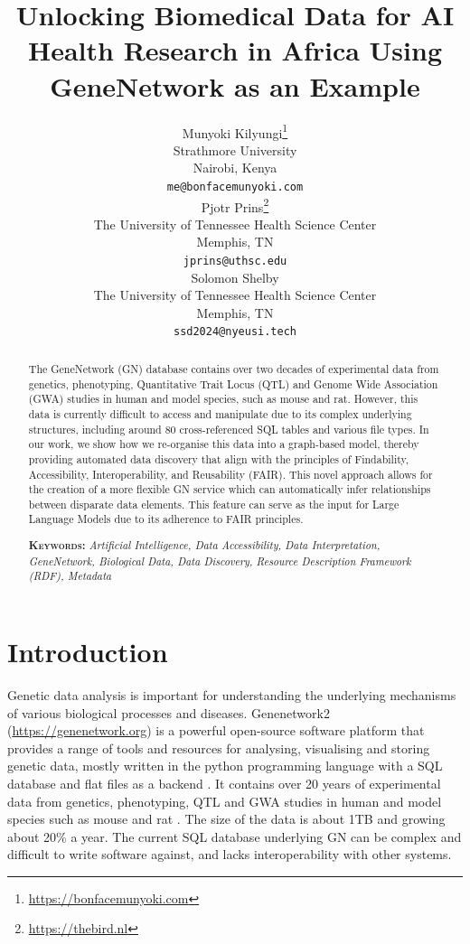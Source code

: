 \documentclass{article}
\title{Unlocking Biomedical Data for AI Health Research in Africa Using GeneNetwork as an Example}
\author{%
  Munyoki Kilyungi\thanks{\url{https://bonfacemunyoki.com}} \\
  Strathmore University\\
  Nairobi, Kenya \\
  \texttt{me@bonfacemunyoki.com} \\
  \And
  Pjotr Prins\thanks{\url{https://thebird.nl}} \\
  The University of Tennessee Health Science Center \\
  Memphis, TN \\
  \texttt{jprins@uthsc.edu} \\
  \AND
  Solomon Shelby \\
  The University of Tennessee Health Science Center \\
  Memphis, TN \\
  \texttt{ssd2024@nyeusi.tech} \\
}
\begin{document}
\maketitle

\begin{abstract}

  The GeneNetwork (GN) database contains over two decades of experimental data from genetics, phenotyping, Quantitative Trait Locus (QTL) and Genome Wide Association (GWA) studies in human and model species, such as mouse and rat.  However, this data is currently difficult to access and manipulate due to its complex underlying structures, including around 80 cross-referenced SQL tables and various file types.  In our work, we show how we re-organise this data into a graph-based model, thereby providing automated data discovery that align with the principles of Findability, Accessibility, Interoperability, and Reusability (FAIR).  This novel approach allows for the creation of a more flexible GN service which can automatically infer relationships between disparate data elements.  This feature can serve as the input for Large Language Models due to its adherence to FAIR principles.

\textbf{\textsc{Keywords:}} \textit{Artificial Intelligence, Data Accessibility, Data Interpretation, GeneNetwork, Biological Data, Data Discovery, Resource Description Framework (RDF), Metadata}
\end{abstract}


\section{Introduction}

Genetic data analysis is important for understanding the underlying mechanisms of various biological processes and diseases.  Genenetwork2 (\url{https://genenetwork.org}) is a powerful open-source software platform that provides a range of tools and resources for analysing, visualising and storing genetic data, mostly written in the python programming language with a SQL database and flat files as a backend \cite{mulligan2017genenetwork}\cite{sloan2016genenetwork}.  It contains over 20 years of experimental data from genetics, phenotyping, QTL and GWA studies in human and model species such as mouse and rat \cite{sloan2016genenetwork}.  The size of the data is about 1TB and growing about 20\% a year.  The current SQL database underlying GN can be complex and difficult to write software against, and lacks interoperability with other systems.
\end{document}
